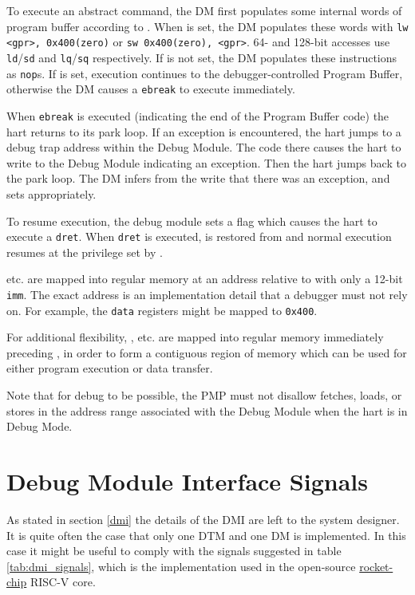To execute an abstract command, the DM first populates some internal words of
program buffer according to \RdmCommand. When \FacAccessregisterTransfer is set, the DM
populates these words with {\tt lw <gpr>, 0x400(zero)} or {\tt sw 0x400(zero), <gpr>}.
64- and 128-bit accesses use {\tt ld}/{\tt sd} and {\tt lq}/{\tt sq}
respectively. If \FacAccessregisterTransfer is not set, the DM populates these instructions as {\tt nop}s.
If \FcsrMcontrolExecute is set, execution continues to the debugger-controlled Program Buffer,
otherwise the DM causes a {\tt ebreak} to execute immediately.

When {\tt ebreak} is executed (indicating the end of the
Program Buffer code) the hart returns to its park loop. If an exception is
encountered, the hart jumps to a debug trap address within
the Debug Module. The code there causes the hart to
write to the Debug Module indicating an exception.
Then the hart jumps back to the park loop.
The DM infers from the write that there was an exception, and sets \FdmAbstractcsCmderr appropriately.

To resume execution, the debug module sets a flag which causes the hart to execute a {\tt dret}.
When {\tt dret} is executed, \Rpc is restored from \RcsrDpc and normal execution resumes at the
privilege set by \FcsrDcsrPrv.

\RdmDataZero etc. are mapped into regular memory at an address relative to \Rzero
with only a 12-bit {\tt imm}. The exact address is an implementation
detail that a debugger must not rely on. For example, the {\tt data}
registers might be mapped to {\tt 0x400}.

For additional flexibility, \RdmProgbufZero, etc. are mapped into regular memory
immediately preceding \RdmDataZero, in order to form a contiguous region of memory which
can be used for either program execution or data transfer.

Note that for debug to be possible, the PMP must not disallow fetches, loads, or stores
in the address range associated with the Debug Module when the hart is in Debug Mode.

\section{Debug Module Interface Signals} \label{dmi_signals}

As stated in section \ref{dmi} the details of the DMI are left to the system designer.
It is quite often the case that only one DTM and one DM is implemented.
In this case it might be useful to comply with the signals suggested in table \ref{tab:dmi_signals},
which is the implementation used in the open-source \href{https://github.com/chipsalliance/rocket-chip/blob/375045a7db1bdc7b4f7851f1a59b3f10a2b922ff/src/main/scala/devices/debug/Debug.scala#L170}{rocket-chip} RISC-V core.

